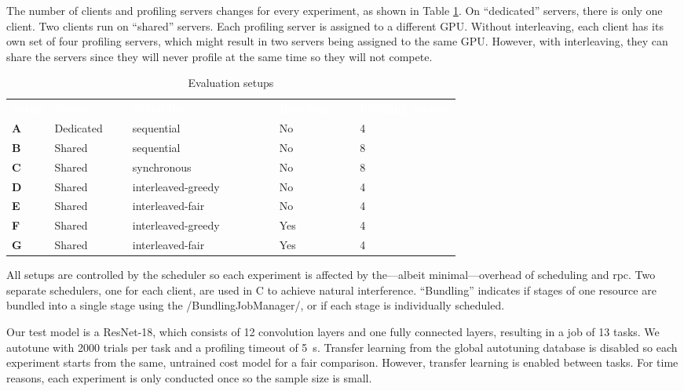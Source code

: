 The number of clients and profiling servers changes for every experiment, as shown in Table \ref{tab:tvm-evaluation-setups}. On \enquote{dedicated} servers, there is only one client. Two clients run on \enquote{shared} servers. Each profiling server is assigned to a different GPU. Without interleaving, each client has its own set of four profiling servers, which might result in two servers being assigned to the same GPU. However, with interleaving, they can share the servers since they will never profile at the same time so they will not compete.
\begin{table}
	\newcommand\heading[1]{\textcolor{white}{\textbf{#1}}}
	\renewcommand{\arraystretch}{1.2}
	\sffamily
	\centering
	\begin{tabularx}{\textwidth}{l l l l X}
	\rowcolor{black} \heading{Setup} & \heading{Server~~~~~} & \heading{Scheduler~~~~~~~~~~~~~} & \heading{Bundling~~~} & \heading{Profiling servers} \vspace{2pt} \\
	\textbf{A} & Dedicated & sequential & No & 4 \\
	\textbf{B} & Shared & sequential & No & 8 \\
	\textbf{C} & Shared & synchronous & No & 8 \\
	\textbf{D} & Shared & interleaved-greedy & No & 4 \\
	\textbf{E} & Shared & interleaved-fair & No & 4 \\
	\textbf{F} & Shared & interleaved-greedy & Yes & 4 \\
	\textbf{G} & Shared & interleaved-fair & Yes & 4 \\
	\end{tabularx}
	\caption{Evaluation setups}
	\label{tab:tvm-evaluation-setups}
\end{table}

All setups are controlled by the scheduler so each experiment is affected by the---albeit minimal---overhead of scheduling and \gls{rpc}. Two separate schedulers, one for each client, are used in C to achieve natural interference. \enquote{Bundling} indicates if stages of one resource are bundled into a single stage using the \pythoninline/BundlingJobManager/, or if each stage is individually scheduled.

Our test model is a ResNet-18, which consists of 12 convolution layers and one fully connected layers, resulting in a job of 13 tasks. We autotune with 2000 trials per task and a profiling timeout of \SI{5}{\second}. Transfer learning from the global autotuning database is disabled so each experiment starts from the same, untrained cost model for a fair comparison. However, transfer learning is enabled between tasks. For time reasons, each experiment is only conducted once so the sample size is small.

